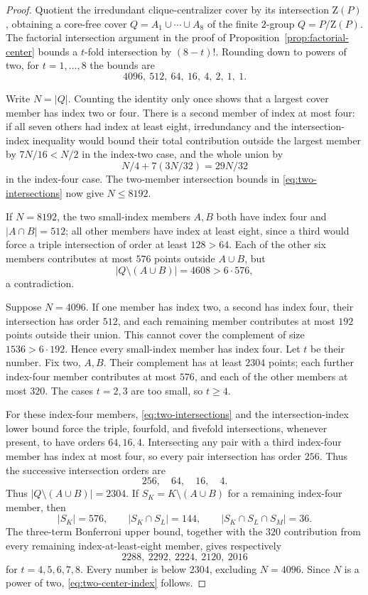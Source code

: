 \documentclass[11pt]{article}
\theoremstyle{remark}
\newcommand{\Z}{\mathrm Z}
\begin{document}
\begin{proof}
Quotient the irredundant clique-centralizer cover by its intersection
$\Z(P)$, obtaining a core-free cover
$Q=A_1\cup\cdots\cup A_8$ of the finite $2$-group $Q=P/\Z(P)$.
The factorial intersection argument in the proof of
Proposition~\ref{prop:factorial-center} bounds a $t$-fold intersection by
$(8-t)!$.  Rounding down to powers of two, for $t=1,\ldots,8$ the bounds are
\begin{equation}
 4096,\ 512,\ 64,\ 16,\ 4,\ 2,\ 1,\ 1.
\label{eq:two-intersections}
\end{equation}

Write $N=|Q|$.  Counting the identity only once shows that a largest cover
member has index two or four.  There is a second member of index at most
four: if all seven others had index at least eight, irredundancy and the
intersection-index inequality would bound their total contribution outside
the largest member by $7N/16<N/2$ in the index-two case, and the whole
union by
\[
 N/4+7(3N/32)=29N/32
\]
in the index-four case.  The two-member intersection bounds in
\eqref{eq:two-intersections} now give $N\le8192$.

If $N=8192$, the two small-index members $A,B$ both have index four and
$|A\cap B|=512$; all other members have index at least eight, since a third
would force a triple intersection of order at least $128>64$.  Each of
the other six members contributes at most $576$ points outside
$A\cup B$, but
\[
 |Q\setminus(A\cup B)|=4608>6\cdot576,
\]
a contradiction.

Suppose $N=4096$.  If one member has index two, a second has index four,
their intersection has order $512$, and each remaining member contributes
at most $192$ points outside their union.  This cannot cover the complement
of size $1536>6\cdot192$.  Hence every small-index member has index four.
Let $t$ be their number.  Fix two, $A,B$.  Their complement has at least
$2304$ points; each further index-four member contributes at most $576$,
and each of the other members at most $320$.  The cases $t=2,3$ are too
small, so $t\ge4$.

For these index-four members,
\eqref{eq:two-intersections} and the intersection-index lower bound force
the triple, fourfold, and fivefold intersections, whenever present, to have
orders $64,16,4$.  Intersecting any pair with a third index-four member has
index at most four, so every pair intersection has order $256$.  Thus the
successive intersection orders are
\[
 256,\quad64,\quad16,\quad4.
\]
Thus $|Q\setminus(A\cup B)|=2304$.  If
$S_K=K\setminus(A\cup B)$ for a remaining index-four member, then
\[
 |S_K|=576,\qquad |S_K\cap S_L|=144,\qquad
 |S_K\cap S_L\cap S_M|=36.
\]
The three-term Bonferroni upper bound, together with the $320$ contribution
from every remaining index-at-least-eight member, gives respectively
\[
 2288,\ 2292,\ 2224,\ 2120,\ 2016
\]
for $t=4,5,6,7,8$.  Every number is below $2304$, excluding $N=4096$.
Since $N$ is a power of two, \eqref{eq:two-center-index} follows.


\end{proof}
\end{document}
